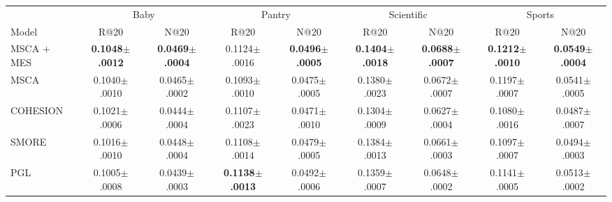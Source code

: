 \begin{table}[t]
\label{tab:sota}
\centering
\footnotesize
\setlength{\tabcolsep}{4pt}
\begin{tabular}{lcccccccc}
\toprule
 & \multicolumn{2}{c}{Baby} & \multicolumn{2}{c}{Pantry} & \multicolumn{2}{c}{Scientific} & \multicolumn{2}{c}{Sports} \\
\cmidrule(lr){2-3}\cmidrule(lr){4-5}\cmidrule(lr){6-7}\cmidrule(lr){8-9}
Model & R@20 & N@20 & R@20 & N@20 & R@20 & N@20 & R@20 & N@20 \\
\midrule
MSCA + MES & \textbf{0.1048{\scriptsize$\pm$.0012}} & \textbf{0.0469{\scriptsize$\pm$.0004}} & 0.1124{\scriptsize$\pm$.0016} & \textbf{0.0496{\scriptsize$\pm$.0005}} & \textbf{0.1404{\scriptsize$\pm$.0018}} & \textbf{0.0688{\scriptsize$\pm$.0007}} & \textbf{0.1212{\scriptsize$\pm$.0010}} & \textbf{0.0549{\scriptsize$\pm$.0004}} \\
\midrule
MSCA~\cite{msca2026} & 0.1040{\scriptsize$\pm$.0010} & 0.0465{\scriptsize$\pm$.0002} & 0.1093{\scriptsize$\pm$.0010}\rlap{$^{\blacktriangledown}$} & 0.0475{\scriptsize$\pm$.0005}\rlap{$^{\blacktriangledown}$} & 0.1380{\scriptsize$\pm$.0023} & 0.0672{\scriptsize$\pm$.0007}\rlap{$^{\blacktriangledown}$} & 0.1197{\scriptsize$\pm$.0007}\rlap{$^{\blacktriangledown}$} & 0.0541{\scriptsize$\pm$.0005}\rlap{$^{\blacktriangledown}$} \\
COHESION~\cite{xu2025cohesion} & 0.1021{\scriptsize$\pm$.0006}\rlap{$^{\blacktriangledown}$} & 0.0444{\scriptsize$\pm$.0004}\rlap{$^{\blacktriangledown}$} & 0.1107{\scriptsize$\pm$.0023} & 0.0471{\scriptsize$\pm$.0010}\rlap{$^{\blacktriangledown}$} & 0.1304{\scriptsize$\pm$.0009}\rlap{$^{\blacktriangledown}$} & 0.0627{\scriptsize$\pm$.0004}\rlap{$^{\blacktriangledown}$} & 0.1080{\scriptsize$\pm$.0016}\rlap{$^{\blacktriangledown}$} & 0.0487{\scriptsize$\pm$.0007}\rlap{$^{\blacktriangledown}$} \\
SMORE~\cite{ong2025smore} & 0.1016{\scriptsize$\pm$.0010}\rlap{$^{\blacktriangledown}$} & 0.0448{\scriptsize$\pm$.0004}\rlap{$^{\blacktriangledown}$} & 0.1108{\scriptsize$\pm$.0014} & 0.0479{\scriptsize$\pm$.0005}\rlap{$^{\blacktriangledown}$} & 0.1384{\scriptsize$\pm$.0013} & 0.0661{\scriptsize$\pm$.0003}\rlap{$^{\blacktriangledown}$} & 0.1097{\scriptsize$\pm$.0007}\rlap{$^{\blacktriangledown}$} & 0.0494{\scriptsize$\pm$.0003}\rlap{$^{\blacktriangledown}$} \\
PGL~\cite{yu2025pgl} & 0.1005{\scriptsize$\pm$.0008}\rlap{$^{\blacktriangledown}$} & 0.0439{\scriptsize$\pm$.0003}\rlap{$^{\blacktriangledown}$} & \textbf{0.1138{\scriptsize$\pm$.0013}} & 0.0492{\scriptsize$\pm$.0006} & 0.1359{\scriptsize$\pm$.0007}\rlap{$^{\blacktriangledown}$} & 0.0648{\scriptsize$\pm$.0002}\rlap{$^{\blacktriangledown}$} & 0.1141{\scriptsize$\pm$.0005}\rlap{$^{\blacktriangledown}$} & 0.0513{\scriptsize$\pm$.0002}\rlap{$^{\blacktriangledown}$} \\

\end{tabular}
\end{table}
